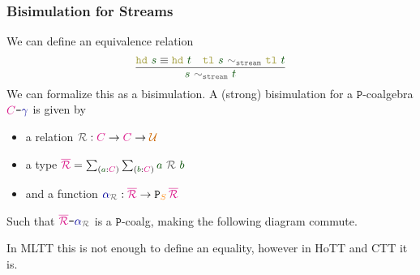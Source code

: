 \documentclass[xelatex,mathserif,serif,notheorems]{beamer} %
\theoremstyle{plain} %
\theoremstyle{definition}
\theoremstyle{remark}
\newcommand*{\term}[1]{\textcolor{green!30!black}{#1}} %
\newcommand*{\type}[1]{\textcolor{magenta!90!black}{#1}}
\newcommand*{\container}[1]{\textcolor{orange}{#1}}
\newcommand*{\universe}[1]{\textcolor{orange!80!black}{#1}}
\newcommand*{\coalg}[2]{#1\texttt{-}#2}
\newcommand*{\relation}[1]{\textcolor{gray!75!black}{\ensuremath{\mathtt{#1}}}}
\newcommand*{\function}[1]{\textcolor{blue!60!black}{\ensuremath{\mathtt{#1}}}}
\newcommand*{\destructor}[1]{\textcolor{yellow!60!black}{\ensuremath{\mathtt{#1}}}}
\newcommand*{\functor}[1]{\ensuremath{\mathbf{\mathtt{#1}}}}
\begin{document}
\begin{frame}[fragile]
  \frametitle{Bisimulation for Streams}
  We can define an equivalence relation
  \begin{equation}
    \vcenter{\infer{\term{s}~\relation{\sim_{stream}}~\term{t}}{\destructor{hd}~\term{s} \equiv \destructor{hd}~\term{t} & \destructor{tl}~\term{s}~\relation{\sim_{stream}}~\destructor{tl}~\term{t}}}
  \end{equation}
  We can formalize this as a bisimulation. A (strong) bisimulation for a \(\functor{P}\)-coalgebra \(\coalg{\type{C}}{\function{\gamma}}\) is given by
  \begin{itemize}
  \item a relation \(\relation{\mathcal{R}} : \type{C} \rightarrow \type{C} \rightarrow \universe{\mathcal{U}}\)
  \item a type \(\type{\overline{\mathcal{R}}} = \sum_{(\term{a} : \type{C})} \sum_{(\term{b} : \type{C})} \term{a}~\relation{\mathcal{R}}~\term{b}\)
  \item and a function \(\function{\alpha}_{\relation{\mathcal{R}}} : \type{\overline{\mathcal{R}}} \rightarrow \functor{P}_{\container{S}}\,\type{\overline{\mathcal{R}}}\)
  \end{itemize}
  Such that \(\coalg{\type{\overline{\mathcal{R}}}}{\function{\alpha}_{\relation{\mathcal{R}}}}\) is a \(\functor{P}\)-coalg, making the following diagram commute.
  \begin{figure}[h]
    \centering
  \end{figure}
  In MLTT this is not enough to define an equality, however in HoTT and CTT it is.
\end{frame}
\end{document}
